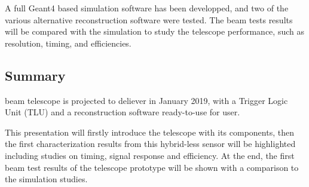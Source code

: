 A full Geant4 based simulation software has been developped, and two of the various alternative reconstruction software were tested.
The beam tests results will be compared with the simulation to study the telescope performance, such as resolution, timing, and efficiencies.

\subsection*{Summary}
\lycoris beam telescope is projected to deliever in January 2019, with a Trigger Logic Unit (TLU) and a reconstruction software ready-to-use for user.

This presentation will firstly introduce the telescope with its components,
then the first characterization results from this hybrid-less sensor will be highlighted including studies on timing, signal response and efficiency.
At the end, the first beam test results of the telescope prototype will be shown with a comparison to the simulation studies.



